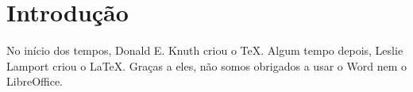 \documentclass[cic,tc,english]{iiufrgs}
\begin{document}

\tableofcontents


\chapter{Introdução}
No início dos tempos, Donald E. Knuth criou o \TeX. Algum tempo depois, Leslie Lamport criou o \LaTeX. Graças a eles, não somos obrigados a usar o Word nem o LibreOffice.




\end{document}

